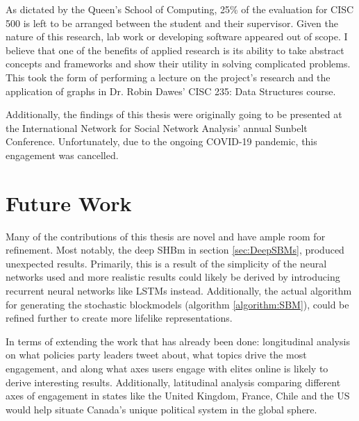As dictated by the Queen’s School of Computing, 25\% of the evaluation for CISC
500 is left to be arranged between the student and their supervisor. Given the
nature of this research, lab work or developing software appeared out of scope.
I believe that one of the benefits of applied research is its ability to take
abstract concepts and frameworks and show their utility in solving complicated
problems. This took the form of performing a lecture on the project's research
and the application of graphs in Dr. Robin Dawes’ CISC 235: Data Structures
course.

Additionally, the findings of this thesis were originally going to be presented
at the International Network for Social Network Analysis' annual Sunbelt
Conference. Unfortunately, due to the ongoing COVID-19 pandemic, this engagement
was cancelled.

\section{Future Work}

Many of the contributions of this thesis are novel and have ample room for
refinement. Most notably, the deep SHBm in section \ref{sec:DeepSBMs}, produced
unexpected results. Primarily, this is a result of the simplicity of the neural
networks used and more realistic results could likely be derived by introducing
recurrent neural networks like LSTMs instead. Additionally, the actual algorithm
for generating the stochastic blockmodels (algorithm \ref{algorithm:SBM}), could
be refined further to create more lifelike representations.

In terms of extending the work that has already been done: longitudinal analysis
on what policies party leaders tweet about, what topics drive the most
engagement, and along what axes users engage with elites online is likely to
derive interesting results. Additionally, latitudinal analysis comparing
different axes of engagement in states like the United Kingdom, France, Chile
and the US would help situate Canada's unique political system in the global
sphere. 